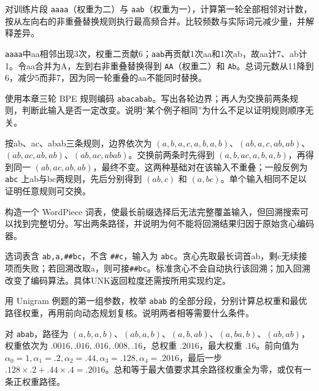 
\begin{exercises}
\begin{exercise} 对训练片段 \texttt{aaaa}（权重为二）与 \texttt{aab}（权重为一），计算第一轮全部相邻对计数，按从左向右的非重叠替换规则执行最高频合并。比较频数与实际词元减少量，并解释差异。

\begin{solution}
\texttt{aaaa}中aa相邻出现3次，权重二贡献6；\texttt{aab}再贡献1次aa和1次ab，故aa计7、ab计1。令aa合并为A，左到右非重叠替换得到 \texttt{AA}（权重二）和 \texttt{Ab}。总词元数从11降到6，减少5而非7，因为同一轮重叠的aa不能同时替换。
\end{solution}
\end{exercise}

\begin{exercise} 使用本章三轮 BPE 规则编码 \texttt{abacabab}。写出各轮边界；再人为交换前两条规则，判断此输入是否一定改变。说明“某个例子相同”为什么不足以证明规则顺序无关。

\begin{solution}
按ab、ac、abab三条规则，边界依次为 $(a,b,a,c,a,b,a,b)$、$(ab,a,c,ab,ab)$、$(ab,ac,ab,ab)$、$(ab,ac,abab)$。交换前两条时先得到 $(a,b,ac,a,b,a,b)$，再得到同一 $(ab,ac,ab,ab)$，最终不变。这两种基础对在该输入不重叠；一般反例为 \texttt{abc} 上ab与bc两规则，先后分别得到 $(ab,c)$ 和 $(a,bc)$。单个输入相同不足以证明任意规则可交换。
\end{solution}
\end{exercise}

\begin{exercise}\optional 构造一个 WordPiece 词表，使最长前缀选择后无法完整覆盖输入，但回溯搜索可以找到完整切分。写出两条路径，并说明为何不能将回溯结果归因于原始贪心编码器。

\begin{solution}
选词表含 \texttt{ab,a,\#\#bc}，不含 \texttt{\#\#c}，输入为 \texttt{abc}。贪心先取最长词首ab，剩c无续接项而失败；若回溯改取a，则可接\texttt{\#\#bc}。标准贪心不会自动执行该回溯；加入回溯改变了编码算法。具体UNK返回粒度还需按所用实现约定。
\end{solution}
\end{exercise}

\begin{exercise}\optional 用 Unigram 例题的第一组参数，枚举 \texttt{abab} 的全部分段，分别计算总权重和最优路径权重，再用前向动态规划复核。说明两者相等需要什么条件。

\begin{solution}
对 \texttt{abab}，路径为 $(a,b,a,b)$、$(ab,a,b)$、$(a,b,ab)$、$(a,ba,b)$、$(ab,ab)$，权重依次为 $.0016,.016,.016,.008,.16$，总权重 $.2016$，最大权重 $.16$。前向值为 $\alpha_0=1,\alpha_1=.2,\alpha_2=.44,\alpha_3=.128,\alpha_4=.2016$，最后一步 $.128\times.2+.44\times.4=.2016$。总和等于最大值要求其余路径权重全为零，或仅有一条正权重路径。
\end{solution}
\end{exercise}


\end{exercises}

